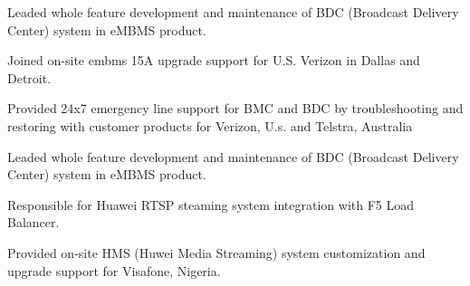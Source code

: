 \documentclass[]{plushcv}
\begin{document}
\begin{minipage}[t]{0.70\textwidth}
\begin{tightemize}
\sectionsep
\item Leaded whole feature development and maintenance of BDC (Broadcast Delivery Center) system in eMBMS product.
\item Joined on-site embms 15A upgrade support for U.S. Verizon in Dallas and Detroit.
\item Provided 24x7 emergency line support for BMC and BDC by troubleshooting and restoring with customer products for Verizon, U.s. and Telstra, Australia
\end{tightemize}
\sectionsep

\begin{tightemize}
\sectionsep
\item Leaded whole feature development and maintenance of BDC (Broadcast Delivery Center) system in eMBMS product.
\end{tightemize}
\sectionsep

\begin{tightemize}
\sectionsep
\item Responsible for Huawei RTSP steaming system integration with F5 Load Balancer.
\item Provided on-site HMS (Huwei Media Streaming) system customization and upgrade support for Visafone, Nigeria.
\end{tightemize}
\sectionsep




\end{minipage}
\end{document}
